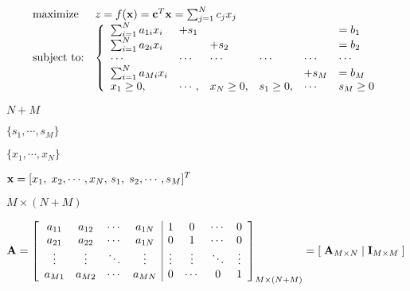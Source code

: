 \documentclass{article}
\def\lthtmlcheckvsize{\ifdim\ht\sizebox<\vsize 
  \ifdim\wd\sizebox<\hsize\expandafter\hfill\fi \expandafter\vfill
  \else\expandafter\vss\fi}%
\begin{document}
{\newpage\clearpage
{}%
\begin{displaymath}\begin{array}{ll}
\mbox{maximize}    & z=f({\bf x})={\bf c}^T{\bf x}=\sum_{j=1}^N c_jx_j\\
\mbox{subject to:} &
\left\{\begin{array}{llllll}
\sum_{i=1}^N a_{1i}x_i&+s_1& & & & =b_1\\
\sum_{i=1}^N a_{2i}x_i& &+s_2& & & =b_2\\
\cdots & \cdots & \cdots &\cdots & \cdots &\cdots \\
\sum_{i=1}^N a_{Mi}x_i & & & & +s_M& =b_M\\
x_1\ge 0,&\cdots,& x_N\ge 0, &s_1\ge 0,&\cdots& s_M\ge 0\end{array}\right.
\end{array}\end{displaymath}%
\lthtmldisplayZ
\lthtmlcheckvsize\clearpage}

{\newpage\clearpage
{}%
$ N+M$%
\lthtmlindisplaymathZ
\lthtmlcheckvsize\clearpage}

{\newpage\clearpage
{}%
$ \{s_1,\cdots,s_M\}$%
\lthtmlindisplaymathZ
\lthtmlcheckvsize\clearpage}

{\newpage\clearpage
{}%
$ \{x_1,\cdots,x_N\}$%
\lthtmlindisplaymathZ
\lthtmlcheckvsize\clearpage}

{\newpage\clearpage
{}%
$\displaystyle {\bf x}=[x_1,\;x_2,\cdots,x_N,\,s_1,\;s_2,\cdots,s_M]^T$%
\lthtmlindisplaymathZ
\lthtmlcheckvsize\clearpage}

{\newpage\clearpage
{}%
$ M\times (N+M)$%
\lthtmlindisplaymathZ
\lthtmlcheckvsize\clearpage}

{\newpage\clearpage
{}%
$\displaystyle {\bf A}=\left[\begin{array}{cccc|cccc}
a_{11} & a_{12} & \cdots & a_{1N} & 1 & 0 & \cdots & 0\\
a_{21} & a_{22} & \cdots & a_{1N} & 0 & 1 & \cdots & 0\\
\vdots&\vdots & \ddots &\vdots &\vdots & \vdots & \ddots & \vdots\\
a_{M1} & a_{M2} & \cdots & a_{MN} & 0 & \cdots & 0 & 1\\
\end{array}\right]_{M\times (N+M)}
=[\;{\bf A}_{M\times N}\;|\; {\bf I}_{M\times M}\;]$%
\lthtmlindisplaymathZ
\lthtmlcheckvsize\clearpage}
\end{document}
